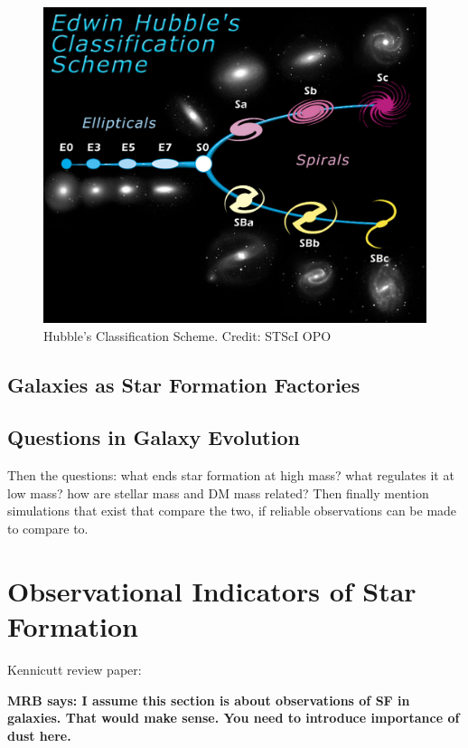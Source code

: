 \begin{figure}
\includegraphics[width=\textwidth]{figures/hubble}
\caption[Short figure name.]{ Hubble's Classification Scheme. Credit: STScI OPO
\label{fig:hubble_classification}}
\end{figure}

\subsection{Galaxies as Star Formation Factories}




\subsection{Questions in Galaxy Evolution}
{Then the questions: what ends star formation at high mass?
what  regulates it at low mass? how are 
stellar mass and DM mass related? Then finally mention
simulations that exist that compare the two, if reliable
observations can be made to compare to.}

\section{Observational Indicators of Star Formation}

Kennicutt review paper: 

{\bf MRB says: I assume this section is about observations 
of SF in galaxies. That would make sense. You need to 
introduce importance of dust here.}

